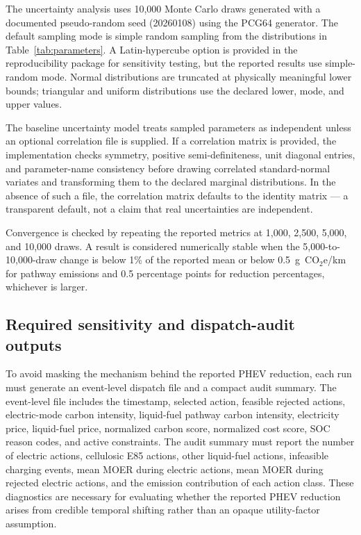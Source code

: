 \documentclass[cleantechnol,article,submit,pdftex,moreauthors]{Definitions/mdpi}
\newcommand{\gcoeqkm}{g~CO$_2$e/km}
\begin{document}
The uncertainty analysis uses 10,000 Monte Carlo draws generated with a documented pseudo-random seed (20260108) using the PCG64 generator. The default sampling mode is simple random sampling from the distributions in Table~\ref{tab:parameters}. A Latin-hypercube option is provided in the reproducibility package for sensitivity testing, but the reported results use simple-random mode. Normal distributions are truncated at physically meaningful lower bounds; triangular and uniform distributions use the declared lower, mode, and upper values.

The baseline uncertainty model treats sampled parameters as independent unless an optional correlation file is supplied. If a correlation matrix is provided, the implementation checks symmetry, positive semi-definiteness, unit diagonal entries, and parameter-name consistency before drawing correlated standard-normal variates and transforming them to the declared marginal distributions. In the absence of such a file, the correlation matrix defaults to the identity matrix --- a transparent default, not a claim that real uncertainties are independent.

Convergence is checked by repeating the reported metrics at 1,000, 2,500, 5,000, and 10,000 draws. A result is considered numerically stable when the 5,000-to-10,000-draw change is below 1\% of the reported mean or below 0.5~\gcoeqkm{} for pathway emissions and 0.5 percentage points for reduction percentages, whichever is larger.


\subsection{Required sensitivity and dispatch-audit outputs}
\label{subsec:required_audit_outputs}

To avoid masking the mechanism behind the reported PHEV reduction, each run must generate an event-level dispatch file and a compact audit summary. The event-level file includes the timestamp, selected action, feasible rejected actions, electric-mode carbon intensity, liquid-fuel pathway carbon intensity, electricity price, liquid-fuel price, normalized carbon score, normalized cost score, SOC reason codes, and active constraints. The audit summary must report the number of electric actions, cellulosic E85 actions, other liquid-fuel actions, infeasible charging events, mean MOER during electric actions, mean MOER during rejected electric actions, and the emission contribution of each action class. These diagnostics are necessary for evaluating whether the reported PHEV reduction arises from credible temporal shifting rather than an opaque utility-factor assumption.
\end{document}
